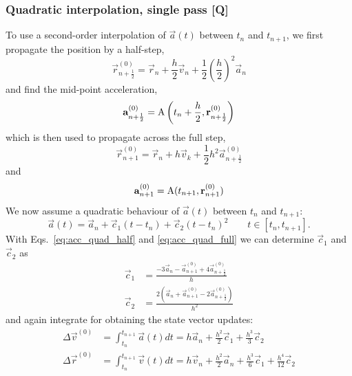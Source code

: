 \documentclass[Orbiter Technical Reference.tex]{subfiles}
\begin{document}
\subsubsection{Quadratic interpolation, single pass [Q]}
To use a second-order interpolation of $\vec{a}(t)$ between $t_n$ and $t_{n+1}$, we first propagate the position by a half-step,
\begin{equation*}
\vec{r}_{n+\frac{1}{2}}^{(0)} = \vec{r}_n + \frac{h}{2} \vec{v}_n + \frac{1}{2}\left(\frac{h}{2}\right)^2\vec{a}_n
\end{equation*}
and find the mid-point acceleration,
\begin{equation}
\mathbf{a}_{n+\frac{1}{2}}^{(0)} = \mathrm{A}\left(t_n+\frac{h}{2},\mathbf{r}_{n+\frac{1}{2}}^{(0)}\right)\label{eq:acc_quad_half}
\end{equation}
which is then used to propagate across the full step,
\begin{equation*}
\vec{r}_{n+1}^{(0)} = \vec{r}_n + h\vec{v}_k + \frac{1}{2}h^2\vec{a}_{n+\frac{1}{2}}^{(0)}
\end{equation*}
and
\begin{equation}
\mathbf{a}_{n+1}^{(0)} = \mathrm{A}(t_{n+1},\mathbf{r}_{n+1}^{(0)})\label{eq:acc_quad_full}
\end{equation}
We now assume a quadratic behaviour of $\vec{a}(t)$ between $t_n$ and $t_{n+1}$:
\begin{equation*}
\vec{a}(t) = \vec{a}_n + \vec{c}_1 (t-t_n) + \vec{c}_2 (t-t_n)^2
\qquad t \in [t_n, t_{n+1}].
\end{equation*}
With Eqs.~\ref{eq:acc_quad_half} and \ref{eq:acc_quad_full} we can determine
$\vec{c}_1$ and $\vec{c}_2$ as
\begin{equation*}
\begin{split}
\vec{c}_1 &= \frac{-3\vec{a}_n - \vec{a}_{n+1}^{(0)} + 4\vec{a}_{n+\frac{1}{2}}^{(0)}}{h} \\
\vec{c}_2 &= \frac{2(\vec{a}_n + \vec{a}_{n+1}^{(0)} - 2 \vec{a}_{n+\frac{1}{2}}^{(0)})}{h^2}
\end{split}
\end{equation*}
and again integrate for obtaining the state vector updates:
\begin{equation*}
\begin{split}
\Delta\vec{v}^{(0)} &= \int_{t_n}^{t_{n+1}} \vec{a}(t) dt = h\vec{a}_n + \frac{h^2}{2} \vec{c}_1 + \frac{h^3}{3} \vec{c}_2 \\
\Delta\vec{r}^{(0)} &= \int_{t_n}^{t_{n+1}} \vec{v}(t) dt = h\vec{v}_n + \frac{h^2}{2}\vec{a}_n + \frac{h^3}{6}\vec{c}_1 + \frac{h^4}{12}\vec{c}_2
\end{split}
\end{equation*}
\end{document}
